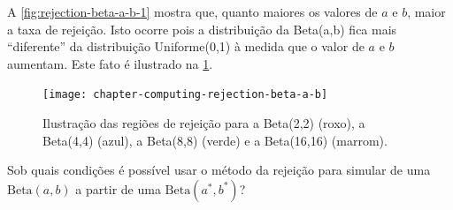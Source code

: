 { A \cref{fig:rejection-beta-a-b-1} mostra que,
 quanto maiores os valores de $a$ e $b$, 
 maior a taxa de rejeição. 
 Isto ocorre pois a distribuição da Beta(a,b) 
 fica mais ``diferente'' da distribuição Uniforme(0,1)
 à medida que o valor de $a$ e $b$ aumentam.
 Este fato é ilustrado na
 \cref{fig:rejection-beta-a-b-2}.

 \begin{figure}
  \centering
  \texttt{[image: chapter-computing-rejection-beta-a-b]}
  \caption{Ilustração das regiões de rejeição
  para a Beta(2,2) (roxo), a Beta(4,4) (azul),
  a Beta(8,8) (verde) e a Beta(16,16) (marrom).}
  \label{fig:rejection-beta-a-b-2}
 \end{figure}
}{}

\begin{exercise}
 Sob quais condições é possível usar
 o método da rejeição para simular de
 uma $\text{Beta}(a,b)$ a partir de uma
 $\text{Beta}(a^{*},b^{*})$?
\end{exercise}

